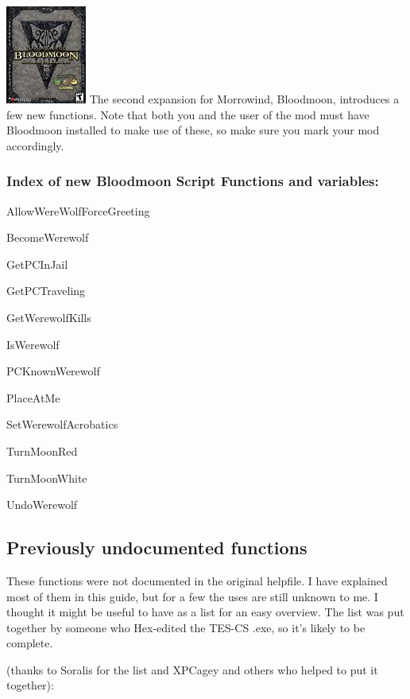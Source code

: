 \includegraphics{media/image7.png} The second expansion for Morrowind,
Bloodmoon, introduces a few new functions. Note that both you and the
user of the mod must have Bloodmoon installed to make use of these, so
make sure you mark your mod accordingly.

\hypertarget{index-of-new-bloodmoon-script-functions-and-variables}{%
\subsubsection{Index of new Bloodmoon Script Functions and
variables:}\label{index-of-new-bloodmoon-script-functions-and-variables}}

AllowWereWolfForceGreeting

BecomeWerewolf

GetPCInJail

GetPCTraveling

GetWerewolfKills

IsWerewolf

PCKnownWerewolf

PlaceAtMe

SetWerewolfAcrobatics

TurnMoonRed

TurnMoonWhite

UndoWerewolf

\hypertarget{previously-undocumented-functions}{%
\subsection{\texorpdfstring{\hfill\break
Previously undocumented
functions}{ Previously undocumented functions}}\label{previously-undocumented-functions}}

These functions were not documented in the original helpfile. I have
explained most of them in this guide, but for a few the uses are still
unknown to me. I thought it might be useful to have as a list for an
easy overview. The list was put together by someone who Hex-edited the
TES-CS .exe, so it's likely to be complete.

(thanks to Soralis for the list and XPCagey and others who helped to put
it together):

